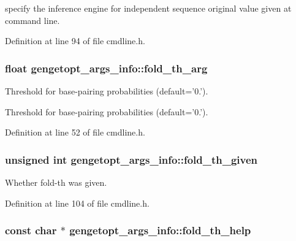 specify the inference engine for independent sequence original value given at command line. 



Definition at line 94 of file cmdline.\+h.

\hypertarget{structgengetopt__args__info_a7b854a8200daa4d15745ae98b20f30f6}{
\subsubsection[{fold\+\_\+th\+\_\+arg}]{\setlength{\rightskip}{0pt plus 5cm}float gengetopt\+\_\+args\+\_\+info\+::fold\+\_\+th\+\_\+arg}}\label{structgengetopt__args__info_a7b854a8200daa4d15745ae98b20f30f6}


Threshold for base-\/pairing probabilities (default='0.'). 

Threshold for base-\/pairing probabilities (default='0.'). 

Definition at line 52 of file cmdline.\+h.

\hypertarget{structgengetopt__args__info_a0a5f7a2dde96bfe36799ed2d38282f75}{
\subsubsection[{fold\+\_\+th\+\_\+given}]{\setlength{\rightskip}{0pt plus 5cm}unsigned int gengetopt\+\_\+args\+\_\+info\+::fold\+\_\+th\+\_\+given}}\label{structgengetopt__args__info_a0a5f7a2dde96bfe36799ed2d38282f75}


Whether fold-\/th was given. 



Definition at line 104 of file cmdline.\+h.

\hypertarget{structgengetopt__args__info_a91fb17190d2ee0c11ba6c6ac16a8be5e}{
\subsubsection[{fold\+\_\+th\+\_\+help}]{\setlength{\rightskip}{0pt plus 5cm}const char $\ast$ gengetopt\+\_\+args\+\_\+info\+::fold\+\_\+th\+\_\+help}}\label{structgengetopt__args__info_a91fb17190d2ee0c11ba6c6ac16a8be5e}


